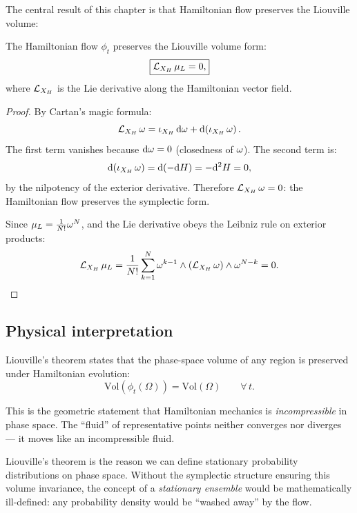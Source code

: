 The central result of this chapter is that Hamiltonian flow preserves the Liouville volume:

\begin{theorem}
The Hamiltonian flow $\phi_t$ preserves the Liouville volume form:
\begin{equation}
\boxed{\mathcal{L}_{X_H}\,\mu_L = 0,}
\end{equation}
where $\mathcal{L}_{X_H}$ is the Lie derivative along the Hamiltonian vector field.
\end{theorem}

\begin{proof}
By Cartan's magic formula:
\begin{equation}
\mathcal{L}_{X_H}\,\omega = \iota_{X_H}\,\dd\omega + \dd(\iota_{X_H}\,\omega).
\end{equation}
The first term vanishes because $\dd\omega = 0$ (closedness of $\omega$). The second term is:
\begin{equation}
\dd(\iota_{X_H}\,\omega) = \dd(-\dd H) = -\dd^2 H = 0,
\end{equation}
by the nilpotency of the exterior derivative. Therefore $\mathcal{L}_{X_H}\,\omega = 0$: the Hamiltonian flow preserves the symplectic form.

Since $\mu_L = \frac{1}{N!}\omega^N$, and the Lie derivative obeys the Leibniz rule on exterior products:
\begin{equation}
\mathcal{L}_{X_H}\,\mu_L = \frac{1}{N!}\sum_{k=1}^{N} \omega^{k-1} \wedge (\mathcal{L}_{X_H}\,\omega) \wedge \omega^{N-k} = 0.
\end{equation}
\end{proof}

\subsection{Physical interpretation}

Liouville's theorem states that the phase-space volume of any region is preserved under Hamiltonian evolution:
\begin{equation}
\text{Vol}(\phi_t(\Omega)) = \text{Vol}(\Omega) \qquad \forall\, t.
\end{equation}

This is the geometric statement that Hamiltonian mechanics is \emph{incompressible} in phase space. The ``fluid'' of representative points neither converges nor diverges --- it moves like an incompressible fluid.

\begin{remark}
Liouville's theorem is the reason we can define stationary probability distributions on phase space. Without the symplectic structure ensuring this volume invariance, the concept of a \emph{stationary ensemble} would be mathematically ill-defined: any probability density would be ``washed away'' by the flow.
\end{remark}

